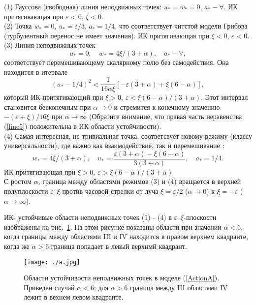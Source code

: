 \documentclass[a4paper,10pt]{article}
\begin{document}
(1)  Гауссова  (свободная) линия  неподвижных точек: $u_{*}=w_{*}=0$, $a_{*}- \forall $.
ИК притягивающая при  $\varepsilon<0$, $\xi<0$.\\

(2) Точка  $w_{*}=0$, $u_{*}=\varepsilon/3$, $a_{*}=1/4$, что соответствует читстой модели Грибова
(турбулентный перенос не имеет значения).
ИК притягивающая при $\xi<0$, $\varepsilon<0$.\\

(3) Линия неподвижных точек
\begin{equation}
u_{*}=0, \quad w_{*}=4\xi/(3+\alpha), \quad  a_{*}- \forall,
\label{line4}
\end{equation}
соответствует перемешивающему скалярному полю без самодействия.
Она находится в итервале
\begin{equation}
(a_{*}-1/4)^{2} < \frac{1}{16\alpha\xi} \left[ -\varepsilon(3+\alpha) +
\xi(6-\alpha)  \right],
\label{line5}
\end{equation}
который ИК-притягивающий при $\xi>0$, $\varepsilon< \xi (6-\alpha)/(3+\alpha)$.
Этот интервал становится бесконечным при $\alpha\to0$ и стремится к конечному
 значению $-(\varepsilon+\xi)/16\xi$ при $\alpha\to\infty$  (Обратите внимание, что правая
часть неравенства (\ref{line5}) положительна в ИК области устойчивости).\\

(4) Самая интересная, не тривиальная точка, соответсвует новому режиму (классу универсальности), где важно как взаимодействие, так и перемешивание :
\begin{equation}
w_{*}= 4\xi/(3+\alpha), \quad u_{*} = \frac{ \varepsilon (3+\alpha) -
\xi(6-\alpha)} {3(3+\alpha)}, \quad a_{*}=1/4.
\label{wu44}
\end{equation}
ИК притягивающая при $\xi>0$, $\varepsilon> \xi (6-\alpha)/(3+\alpha)$ \\


С ростом $\alpha$, граница между областями режимов (3) и (4) вращается в
верхней полуплоскости $\varepsilon$--$\xi$ против часовой стрелки от луча  $\xi=\varepsilon/2$ ($\alpha\to0$) к  $\xi=-\varepsilon$ ($\alpha\to\infty$).

ИК- устойчивые области неподвижных точек (1) - (4) в $\varepsilon$--$\xi$-плоскости изображены на рис.~\ref{fig:pattA}.
На этом рисунке показаны области при значении $\alpha<6$,
 когда границы между областями III и IV находится в правом верхнем квадранте, когда же $\alpha>6$ граница попадает в левый верхнмй квадрант.

\begin{figure}[H]
\begin{center}
\texttt{[image: ./a.jpg]}
\caption{\label{fig:pattA} Области устойчивости неподвижных точек в моделе
(\protect\ref{ActionA}). Приведен случай $\alpha<6$;
для $\alpha>6$ граница между III областями IV лежит в вехнем левом квадранте.}
\end{center}
\end{figure}
\end{document}
